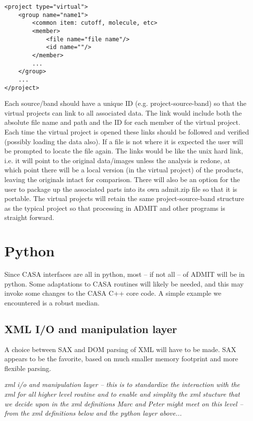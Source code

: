 \documentclass{article}
\begin{document}
\begin{verbatim}
<project type="virtual">
    <group name="name1">
    	<common item: cutoff, molecule, etc>
    	<member>
    		<file name="file name"/>
    		<id name=""/>
    	</member>
    	...
    </group>
    ...
</project>
\end{verbatim}

Each source/band should have a unique ID (e.g. project-source-band) so
that the virtual projects can link to all associated data. The link
would include both the absolute file name and path and the ID for each
member of the virtual project. Each time the virtual project is opened
these links should be followed and verified (possibly loading the data
also). If a file is not where it is expected the user will be prompted
to locate the file again. The links would be like the unix hard link,
i.e. it will point to the original data/images unless the analysis is
redone, at which point there will be a local version (in the virtual
project) of the products, leaving the originals intact for
comparison. There will also be an option for the user to package up
the associated parts into its own admit.zip file so that it is
portable. The virtual projects will retain the same
project-source-band structure as the typical project so that
processing in ADMIT and other programs is straight forward.

\section{Python}

Since CASA interfaces are all in python, most -- if not all -- of
ADMIT will be in python. Some adaptations to CASA routines will
likely be needed, and this may invoke some changes to the CASA
C++ core code. A simple example we encountered is
a robust median.

\subsection{XML I/O and manipulation layer}

A choice between SAX and DOM parsing of XML will have to be made.
SAX appears to be the favorite, based on much smaller memory
footprint and more flexible parsing.




{\it xml i/o and manipulation layer -- this is to standardize
the interaction with the xml for all higher level
routine and to enable and simplity the xml stucture
that we decide upon in the xml definitions
Marc and Peter might meet on this level -- from the
xml definitions below and the python layer above...}
\end{document}
